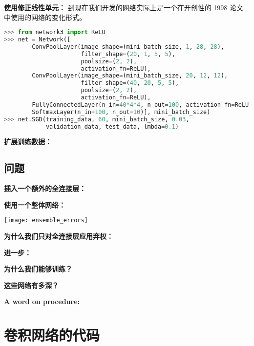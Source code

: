 \textbf{使用修正线性单元：} 到现在我们开发的网络实际上是一个在开创性的 1998 论文
中使用的网络的变化形式。

\begin{lstlisting}[language=Python]
>>> from network3 import ReLU
>>> net = Network([
        ConvPoolLayer(image_shape=(mini_batch_size, 1, 28, 28), 
                      filter_shape=(20, 1, 5, 5), 
                      poolsize=(2, 2), 
                      activation_fn=ReLU),
        ConvPoolLayer(image_shape=(mini_batch_size, 20, 12, 12), 
                      filter_shape=(40, 20, 5, 5), 
                      poolsize=(2, 2), 
                      activation_fn=ReLU),
        FullyConnectedLayer(n_in=40*4*4, n_out=100, activation_fn=ReLU),
        SoftmaxLayer(n_in=100, n_out=10)], mini_batch_size)
>>> net.SGD(training_data, 60, mini_batch_size, 0.03, 
            validation_data, test_data, lmbda=0.1)
\end{lstlisting}

\textbf{扩展训练数据：}

\subsection*{问题}

\textbf{插入一个额外的全连接层：}

\textbf{使用一个整体网络：}

\begin{center}
  \texttt{[image: ensemble\_errors]}
\end{center}

\textbf{为什么我们只对全连接层应用弃权：}

\textbf{进一步：}

\textbf{为什么我们能够训练？}

\textbf{这些网络有多深？}

\textbf{A word on procedure:}

\section{卷积网络的代码}
\label{sec:the_code_for_our_convolutional_networks}

